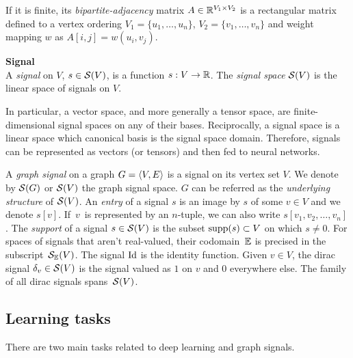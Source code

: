 If it is finite, its \emph{bipartite-adjacency} matrix $A \in \mathbb{R}^{V_1 \times V_2}$ is a rectangular matrix defined \wrt to a vertex ordering $V_1 = \{u_1, \ldots, u_n\}$, $V_2 = \{v_1, \ldots, v_n\}$ and weight mapping $w$ as $A[i,j] = w(u_i,v_j)$.

\begin{definition}\textbf{Signal}\\
A \emph{signal} on $V$, $s \in \mathcal{S}(V)$, is a function $s: V \rightarrow \mathbb{R}$.
The \emph{signal space} $\mathcal{S}(V)$ is the linear space of signals on $V$.
\end{definition}

\begin{remark}
In particular, a vector space, and more generally a tensor space, are finite-dimensional signal spaces on any of their bases. Reciprocally, a signal space is a linear space which canonical basis is the signal space domain. Therefore, signals can be represented as vectors (or tensors) and then fed to neural networks.
\end{remark}

A \emph{graph signal} on a graph $G = \langle V, E \rangle$ is a signal on its vertex set $V$. We denote by $\mathcal{S}(G)$ or $\mathcal{S}(V)$ the graph signal space. $G$ can be referred as the \emph{underlying structure} of $\mathcal{S}(V)$.
An \emph{entry} of a signal $s$ is an image by $s$ of some $v \in V$ and we denote $s[v]$. If~$v$~is represented by an $n$-tuple, we can also write $s[v_1, v_2, \ldots, v_n]$.
The \emph{support} of a signal $s \in \mathcal{S}(V)$ is the subset $\operatorname{supp}(s) \subset V$ on which $s \neq 0$.
For spaces of signals that aren't real-valued, their codomain~$\mathbb{E}$ is precised in the subscript~$\mathcal{S}_{\mathbb{E}}(V)$.
The signal $\operatorname{Id}$ is the identity function.
Given $v \in V$, the dirac signal $\delta_v \in \mathcal{S}(V)$ is the signal valued as $1$ on $v$ and $0$ everywhere else. The family of all dirac signals spans~$\mathcal{S}(V)$.

\subsection{Learning tasks}

There are two main tasks related to deep learning and graph signals.

